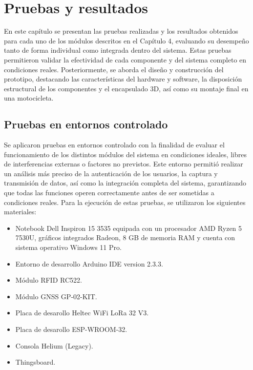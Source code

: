 \fancyhead{}
\fancyfoot{}
\pagestyle{plain}


\chapter{Pruebas y resultados}

En este capítulo se presentan las pruebas realizadas y los resultados obtenidos para cada uno de los módulos descritos en el Capítulo 4, evaluando su desempeño tanto de forma individual como integrada dentro del sistema. Estas pruebas permitieron validar la efectividad de cada componente y del sistema completo en condiciones reales. Posteriormente, se aborda el diseño y construcción del prototipo, destacando las características del hardware y software, la disposición estructural de los componentes y el encapsulado 3D, así como su montaje final en una motocicleta.

\section{Pruebas en entornos controlado}

Se aplicaron pruebas en entornos controlado con la finalidad de  evaluar el funcionamiento de los distintos módulos del sistema en condiciones ideales, libres de interferencias externas o factores no previstos. Este entorno permitió realizar un análisis más preciso de la autenticación de los usuarios, la captura y transmisión de datos, así como la integración completa del sistema, garantizando que todas las funciones operen correctamente antes de ser sometidas a condiciones reales.
Para la ejecución de estas pruebas, se utilizaron los siguientes materiales:
\begin{itemize}
\item Notebook Dell Inspiron 15 3535 equipada con un procesador AMD Ryzen 5 7530U, gráficos integrados Radeon, 8 GB de memoria RAM y cuenta con sistema operativo Windows 11 Pro. 
\item Entorno de desarrollo Arduino IDE version 2.3.3.
\item Módulo RFID RC522. 
\item Módulo GNSS GP-02-KIT.
\item Placa de desarollo Heltec WiFi LoRa 32 V3. 
\item Placa de desarollo ESP-WROOM-32.
\item Consola Helium (Legacy).
\item Thingsboard.
\end{itemize}


